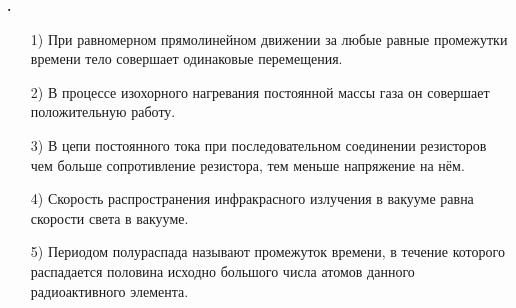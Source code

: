 \documentclass[12pt,a4paper]{article}
\newif\ifShowSolutions
\newcounter{banktask}
\newcommand{\BankTask}[3]{%
  \refstepcounter{banktask}%
  \Needspace{35mm}\par\medskip\noindent\begin{minipage}{\linewidth}%
  \noindent\textbf{\thebanktask.}\quad #2\par
  \ifShowSolutions
    #3\par
    \ifdefined\TutorEdition
      \ifcsname TutorSource#1\endcsname
        \smallskip{\small\csname TutorSource#1\endcsname\par}%
      \fi
    \fi
  \fi
  \end{minipage}\par\medskip
}
\begin{document}
\BankTask{C2CF4D}{
\begin{enumerate}
\item[1)] При равномерном прямолинейном движении за любые равные промежутки времени тело совершает одинаковые перемещения.
\item[2)] В процессе изохорного нагревания постоянной массы газа он совершает положительную работу.
\item[3)] В цепи постоянного тока при последовательном соединении резисторов чем больше сопротивление резистора, тем меньше напряжение на нём.
\item[4)] Скорость распространения инфракрасного излучения в вакууме равна скорости света в вакууме.
\item[5)] Периодом полураспада называют промежуток времени, в течение которого распадается половина исходно большого числа атомов данного радиоактивного элемента.
\end{enumerate}
}{
\smallskip\noindent\textbf{Решение от GPT}\par
1) Верно: при постоянной скорости $\Delta\vec r=\vec v\Delta t$, поэтому равным промежуткам времени соответствуют одинаковые перемещения. 2) Неверно: при постоянном объёме работа газа $A=0$. 3) Неверно: при последовательном соединении ток одинаков, поэтому по закону Ома $U=IR$ напряжение больше на резисторе с большим сопротивлением. 4) Верно: инфракрасное излучение является электромагнитным и распространяется в вакууме со скоростью $c$. 5) Верно: за период полураспада число нераспавшихся атомов уменьшается вдвое; ответ: $145$.
}
\end{document}
